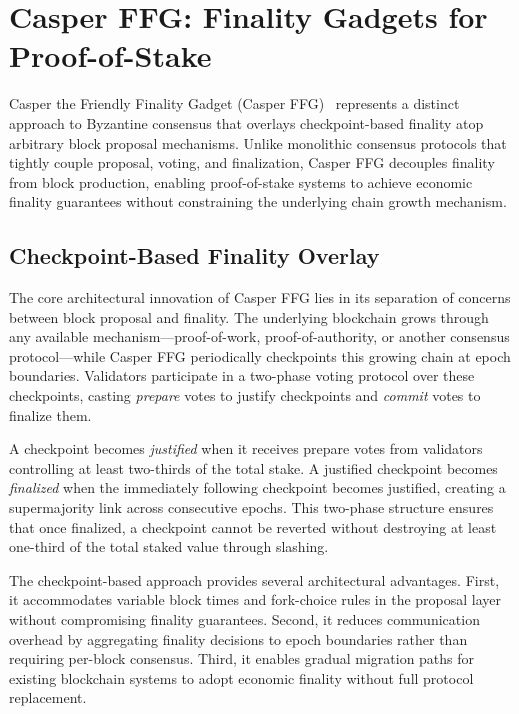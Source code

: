 \section{Casper FFG: Finality Gadgets for Proof-of-Stake}

Casper the Friendly Finality Gadget (Casper FFG)~\cite{buterin2020combining} represents a distinct approach to Byzantine consensus that overlays checkpoint-based finality atop arbitrary block proposal mechanisms. Unlike monolithic consensus protocols that tightly couple proposal, voting, and finalization, Casper FFG decouples finality from block production, enabling proof-of-stake systems to achieve economic finality guarantees without constraining the underlying chain growth mechanism.

\subsection{Checkpoint-Based Finality Overlay}

The core architectural innovation of Casper FFG lies in its separation of concerns between block proposal and finality. The underlying blockchain grows through any available mechanism---proof-of-work, proof-of-authority, or another consensus protocol---while Casper FFG periodically checkpoints this growing chain at epoch boundaries. Validators participate in a two-phase voting protocol over these checkpoints, casting \emph{prepare} votes to justify checkpoints and \emph{commit} votes to finalize them.

A checkpoint becomes \emph{justified} when it receives prepare votes from validators controlling at least two-thirds of the total stake. A justified checkpoint becomes \emph{finalized} when the immediately following checkpoint becomes justified, creating a supermajority link across consecutive epochs. This two-phase structure ensures that once finalized, a checkpoint cannot be reverted without destroying at least one-third of the total staked value through slashing.

The checkpoint-based approach provides several architectural advantages. First, it accommodates variable block times and fork-choice rules in the proposal layer without compromising finality guarantees. Second, it reduces communication overhead by aggregating finality decisions to epoch boundaries rather than requiring per-block consensus. Third, it enables gradual migration paths for existing blockchain systems to adopt economic finality without full protocol replacement.

